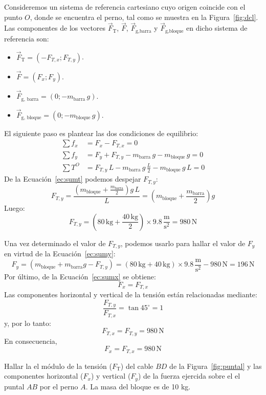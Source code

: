 \documentclass[addpoints]{exam}
\newcommand{\grado}[0]{^{\circ}}
\begin{document}
\begin{questions}
    \begin{solution}
    Consideremos un sistema de referencia cartesiano cuyo origen coincide con el punto $O$, donde se encuentra el perno, tal como se muestra en la Figura~\ref{fig:dcl}. Las componentes de los vectores $\vec{F}_\text{T}$, $\vec{F}$, $\vec{F}_\text{g,barra}$ y $\vec{F}_\text{g,bloque}$ en dicho sistema de referencia son:
    \begin{itemize}
        \item $\vec{F}_\text{T} = \left(-F_{T,x};F_{T,y}\right)$.
        \item $\vec{F} = \left(F_x;F_y\right)$.
        \item $\vec{F}_\text{g, barra} = \left(0;-m_\text{barra} \, g\right)$.
        \item $\vec{F}_\text{g, bloque} = \left(0;-m_\text{bloque} \, g\right)$.
    \end{itemize} El siguiente paso es plantear las dos condiciones de equilibrio:
    \begin{align}
        \sum f_x &= F_x - F_{T,x} = 0 \label{ec:sumx} \\
        \sum f_y &= F_y + F_{T,y} - m_\text{barra} \, g -m_\text{bloque} \, g = 0 \label{ec:sumy} \\
        \sum T^{O} &= F_{T,y} \, L - m_\text{barra} \, g \, \frac{L}{2} -m_\text{bloque} \, g \, L = 0 \label{ec:sumt} 
    \end{align} De la Ecuación~\eqref{ec:sumt} podemos despejar $F_{T,y}$: $$F_{T,y} = \frac{\left(m_\text{bloque} + \frac{m_\text{barra}}{2}\right) g\, L}{L} = \left(m_\text{bloque} + \frac{m_\text{barra}}{2}\right) g$$ Luego: $$F_{T,y} = \left(80 \, \text{kg} + \frac{40 \, \text{kg}}{2}\right) \times 9.8 \, \frac{\text{m}}{\text{s}^2} = 980 \, \text{N}$$

    Una vez determinado el valor de $F_{T,y}$, podemos usarlo para hallar el valor de $F_y$ en virtud de la Ecuación~\eqref{ec:sumy}: $$F_y = \left(m_\text{bloque} + m_\text{barra} g - F_{T,y}\right) = \left(80 \, \text{kg} + 40 \, \text{kg}\right) \times 9.8 \, \frac{\text{m}}{\text{s}^2} - 980 \, \text{N} = 196 \, \text{N}$$ Por último, de la Ecuación~\eqref{ec:sumx} se obtiene: $$F_x = F_{T,x}$$ Las componentes horizontal y vertical de la tensión están relacionadas mediante: $$\frac{F_{T,y}}{F_{T,x}} = \tan 45\grado = 1$$ y, por lo tanto: $$F_{T,x} = F_{T,y} = 980 \, \text{N}$$ En consecuencia, $$F_x = F_{T,x} = 980 \, \text{N}$$
    \end{solution}

    \question Hallar la el módulo de la tensión ($F_\text{T}$) del cable $BD$ de la Figura~\ref{fig:puntal} y las componentes horizontal ($F_x$) y vertical ($F_y$) de la fuerza ejercida sobre el el puntal $AB$ por el perno $A$. La masa del bloque es de 10 kg.


\end{questions}
\end{document}
